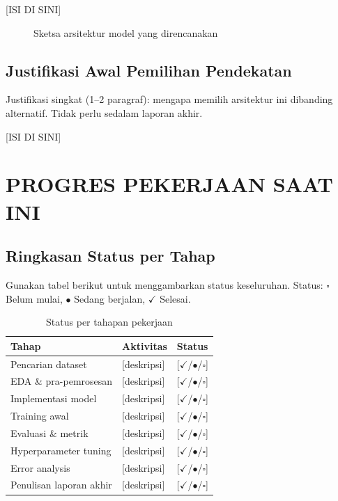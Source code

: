 \documentclass[11pt,a4paper,oneside]{report}
\begin{document}
[ISI DI SINI]

\begin{figure}[h!]
\centering
{}
\caption{Sketsa arsitektur model yang direncanakan}
\label{fig:arsitektur-sementara}
\end{figure}

\section{Justifikasi Awal Pemilihan Pendekatan}
\begin{petunjuk}
Justifikasi singkat (1--2 paragraf): mengapa memilih arsitektur ini dibanding alternatif. Tidak perlu sedalam laporan akhir.
\end{petunjuk}

[ISI DI SINI]

\chapter{PROGRES PEKERJAAN SAAT INI}
\label{bab:progres}

\section{Ringkasan Status per Tahap}
\begin{petunjuk}
Gunakan tabel berikut untuk menggambarkan status keseluruhan. Status: $\square$ Belum mulai, $\bullet$ Sedang berjalan, $\checkmark$ Selesai.
\end{petunjuk}

\begin{table}[h!]
\centering
\caption{Status per tahapan pekerjaan}
\label{tab:status-tahapan}
\begin{tabularx}{\textwidth}{lXl}
\toprule
\textbf{Tahap} & \textbf{Aktivitas} & \textbf{Status} \\
\midrule
Pencarian dataset      & [deskripsi]       & [$\checkmark$/$\bullet$/$\square$] \\
EDA \& pra-pemrosesan  & [deskripsi]       & [$\checkmark$/$\bullet$/$\square$] \\
Implementasi model     & [deskripsi]       & [$\checkmark$/$\bullet$/$\square$] \\
Training awal          & [deskripsi]       & [$\checkmark$/$\bullet$/$\square$] \\
Evaluasi \& metrik     & [deskripsi]       & [$\checkmark$/$\bullet$/$\square$] \\
Hyperparameter tuning  & [deskripsi]       & [$\checkmark$/$\bullet$/$\square$] \\
Error analysis         & [deskripsi]       & [$\checkmark$/$\bullet$/$\square$] \\
Penulisan laporan akhir & [deskripsi]      & [$\checkmark$/$\bullet$/$\square$] \\
\bottomrule
\end{tabularx}
\end{table}
\end{document}
